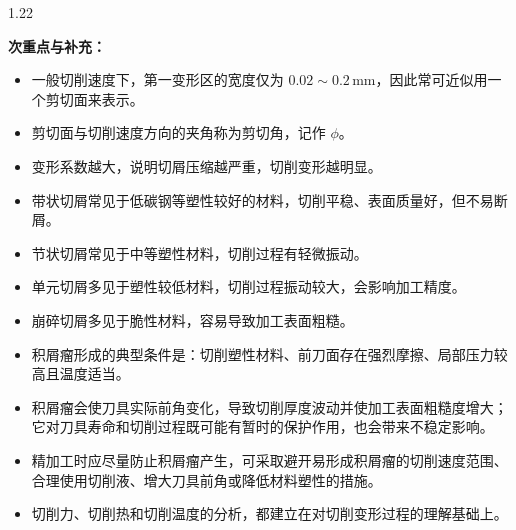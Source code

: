 \documentclass[12pt,a4paper]{article}
\begin{document}
\begin{spacing}{1.22}
\begin{tcolorbox}[colback=yellow!6,colframe=red!55!black,title=重点,left=1mm,right=1mm]
\begin{enumerate}[leftmargin=2.2em,label=\arabic*.]
\end{enumerate}
\end{tcolorbox}
\noindent\textbf{次重点与补充：}
\begin{itemize}[leftmargin=2.2em,label=--]
  \item 一般切削速度下，第一变形区的宽度仅为 $0.02\sim0.2\,\mathrm{mm}$，因此常可近似用一个剪切面来表示。
  \item 剪切面与切削速度方向的夹角称为剪切角，记作 $\phi$。
  \item 变形系数越大，说明切屑压缩越严重，切削变形越明显。
  \item 带状切屑常见于低碳钢等塑性较好的材料，切削平稳、表面质量好，但不易断屑。
  \item 节状切屑常见于中等塑性材料，切削过程有轻微振动。
  \item 单元切屑多见于塑性较低材料，切削过程振动较大，会影响加工精度。
  \item 崩碎切屑多见于脆性材料，容易导致加工表面粗糙。
  \item 积屑瘤形成的典型条件是：切削塑性材料、前刀面存在强烈摩擦、局部压力较高且温度适当。
  \item 积屑瘤会使刀具实际前角变化，导致切削厚度波动并使加工表面粗糙度增大；它对刀具寿命和切削过程既可能有暂时的保护作用，也会带来不稳定影响。
  \item 精加工时应尽量防止积屑瘤产生，可采取避开易形成积屑瘤的切削速度范围、合理使用切削液、增大刀具前角或降低材料塑性的措施。
  \item 切削力、切削热和切削温度的分析，都建立在对切削变形过程的理解基础上。
\end{itemize}


\end{spacing}
\end{document}
